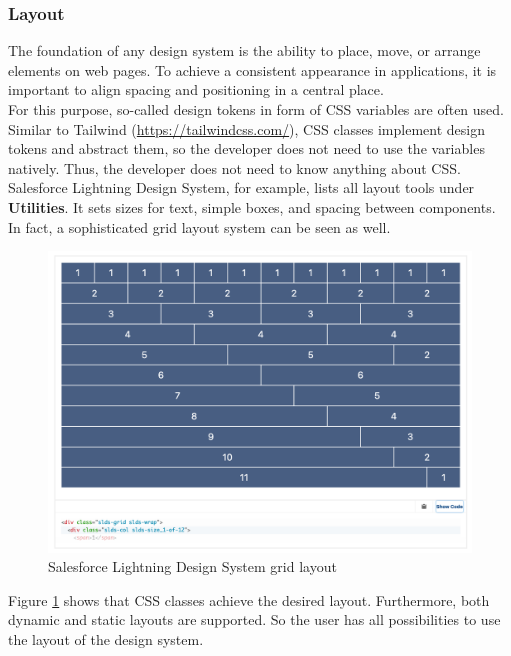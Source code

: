 \subsubsection{Layout} \label{layout}
The foundation of any design system is the ability to place, move, or arrange elements on web pages. To achieve a consistent appearance in applications, it is important to align spacing and positioning in a central place. \\ 
For this purpose, so-called design tokens in form of CSS variables are often used. Similar to Tailwind (\url{https://tailwindcss.com/}), CSS classes implement design tokens and abstract them, so the developer does not need to use the variables natively. Thus, the developer does not need to know anything about CSS.  \\
Salesforce Lightning Design System, for example, lists all layout tools under \textbf{Utilities}. It sets sizes for text, simple boxes, and spacing between components. In fact, a sophisticated grid layout system can be seen as well. \\
\begin{figure}[hbtp]
	\centerline{\includegraphics[width=\linewidth]{images/salesforce_lightning_layout.png}}
	\caption{Salesforce Lightning Design System grid layout \cite{lightning_design_system_lightning_nodate}}
	\label{salesforce_lightning_layout}
\end{figure} 

Figure \ref{salesforce_lightning_layout} shows that CSS classes achieve the desired layout. Furthermore, both dynamic and static layouts are supported. So the user has all possibilities to use the layout of the design system.\\

